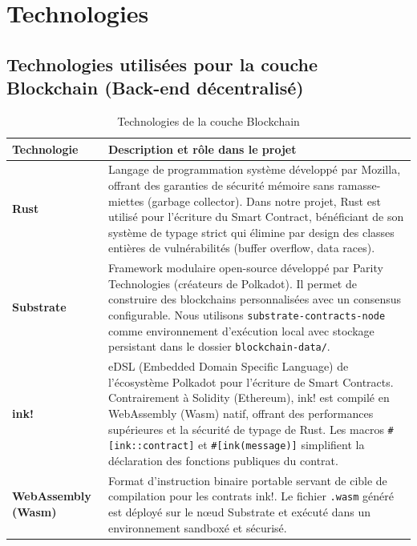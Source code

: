 \documentclass[12pt,a4paper]{report}
\begin{document}
\section{Technologies}

\subsection{Technologies utilisées pour la couche Blockchain (Back-end décentralisé)}

\begin{table}[H]
    \centering
    \caption{Technologies de la couche Blockchain}
    \label{tab:tech_blockchain}
    \begin{tabular}{|p{3.5cm}|p{10cm}|}
        \hline
        \textbf{Technologie} & \textbf{Description et rôle dans le projet} \\
        \hline
        \textbf{Rust} & Langage de programmation système développé par Mozilla, offrant des garanties de sécurité mémoire sans ramasse-miettes (garbage collector). Dans notre projet, Rust est utilisé pour l'écriture du Smart Contract, bénéficiant de son système de typage strict qui élimine par design des classes entières de vulnérabilités (buffer overflow, data races). \\
        \hline
        \textbf{Substrate} & Framework modulaire open-source développé par Parity Technologies (créateurs de Polkadot). Il permet de construire des blockchains personnalisées avec un consensus configurable. Nous utilisons \texttt{substrate-contracts-node} comme environnement d'exécution local avec stockage persistant dans le dossier \texttt{blockchain-data/}. \\
        \hline
        \textbf{ink!} & eDSL (Embedded Domain Specific Language) de l'écosystème Polkadot pour l'écriture de Smart Contracts. Contrairement à Solidity (Ethereum), ink! est compilé en WebAssembly (Wasm) natif, offrant des performances supérieures et la sécurité de typage de Rust. Les macros \texttt{\#[ink::contract]} et \texttt{\#[ink(message)]} simplifient la déclaration des fonctions publiques du contrat. \\
        \hline
        \textbf{WebAssembly (Wasm)} & Format d'instruction binaire portable servant de cible de compilation pour les contrats ink!. Le fichier \texttt{.wasm} généré est déployé sur le nœud Substrate et exécuté dans un environnement sandboxé et sécurisé. \\
        \hline
    \end{tabular}
\end{table}
\end{document}
